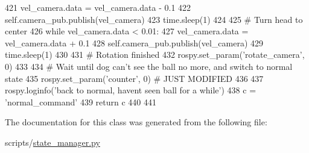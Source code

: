 \begin{DoxyCode}
421                     vel\_camera.data = vel\_camera.data - 0.1
422                     self.camera\_pub.publish(vel\_camera)
423                     time.sleep(1)
424 
425                 \textcolor{comment}{# Turn head to center}
426                 \textcolor{keywordflow}{while} vel\_camera.data < 0.01:
427                     vel\_camera.data = vel\_camera.data + 0.1
428                     self.camera\_pub.publish(vel\_camera)
429                     time.sleep(1)
430 
431                 \textcolor{comment}{# Rotation finished}
432                 rospy.set\_param(\textcolor{stringliteral}{'rotate\_camera'}, 0)
433 
434                 \textcolor{comment}{# Wait until dog can't see the ball no more, and switch to normal state}
435                 rospy.set\_param(\textcolor{stringliteral}{'counter'}, 0)  \textcolor{comment}{# JUST MODIFIED}
436 
437         rospy.loginfo(\textcolor{stringliteral}{'back to normal, havent seen ball for a while'})
438         c = \textcolor{stringliteral}{'normal\_command'}
439         \textcolor{keywordflow}{return} c
440 
441 
\end{DoxyCode}


The documentation for this class was generated from the following file\+:\begin{DoxyCompactItemize}
\item 
scripts/\hyperlink{state__manager_8py}{state\+\_\+manager.\+py}\end{DoxyCompactItemize}
